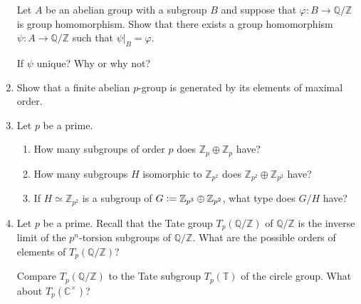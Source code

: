 \documentclass[12pt]{article}
\newcommand{\CC}{{\mathbb C}}
\newcommand{\QQ}{{\mathbb Q}}
\newcommand{\TT}{{\mathbb T}}
\newcommand{\ZZ}{{\mathbb Z}}
\begin{document}
\begin{enumerate}
  Let $A$ be an abelian group with a subgroup $B$ and suppose that $\varphi\colon B\to \QQ/\ZZ$ is group homomorphism.
  Show that there exists a group homomorphism $\psi\colon A\to \QQ/\ZZ$ such that $\psi|_B=\varphi$.

  If $\psi$ unique?  Why or why not?

\item Show that a finite abelian $p$-group is generated by its elements of maximal order.

\item Let $p$ be a prime.
  \begin{enumerate}
   \item  How many subgroups of order $p$ does $\ZZ_p\oplus\ZZ_p$ have?

   \item How many subgroups $H$ isomorphic to $\ZZ_{p^2}$ does $\ZZ_{p^2}\oplus\ZZ_{p^2}$ have?

   \item If $H\simeq \ZZ_{p^2}$ is a subgroup of
     $G\vcentcolon=\ZZ_{p^3}\oplus\ZZ_{p^2}$, 
     what  type does $G/H$ have?

  \end{enumerate}


\item  Let $p$ be a prime.
  Recall that the Tate group $T_p(\QQ/\ZZ)$ of $\QQ/\ZZ$ is the inverse limit of the $p^n$-torsion subgroups of $\QQ/\ZZ$.
  What are the possible orders of elements of $T_p(\QQ/\ZZ)$?

  Compare $T_p(\QQ/\ZZ)$ to the Tate subgroup $T_p(\TT)$ of the circle group.
  What about $T_p(\CC^\times)$?
  



      
\end{enumerate}
\end{document}
